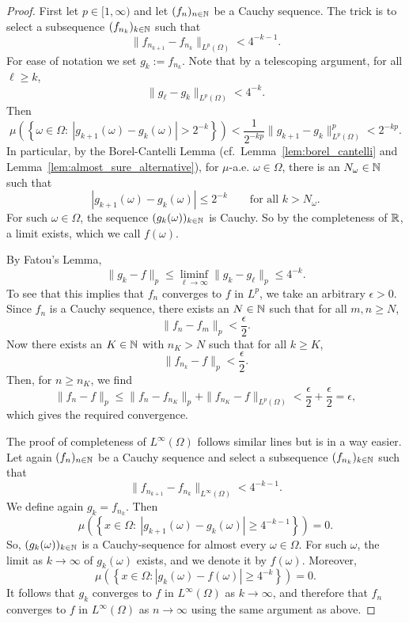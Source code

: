 \begin{proof}
First let $p \in [1,\infty)$ and let $(f_n)_{n\in\mathbb N}$ be a Cauchy sequence. The trick is to select a subsequence $(f_{n_k})_{k\in\mathbb N}$ such that 
\[
\| f_{n_{k+1}} - f_{n_k} \|_{L^p(\Omega)} < 4^{-k-1}.
\]
For ease of notation we set $g_k := f_{n_{k}}$.
Note that by a telescoping argument, for all $\ell \geq k$,
\[
\| g_\ell - g_k \|_{L^p(\Omega)} < 4^{-k}.
\]
Then
\[
\mu \left(\left\{ \omega \in \Omega : \ |g_{k+1}(\omega) - g_k(\omega) | 
> 2^{-k}  \right\} \right) < \frac{1}{2^{-k p} }\| g_{k+1} - g_k \|_{L^p(\Omega)}^p <2^{-kp}.
\]
In particular, by the Borel-Cantelli Lemma (cf.\ Lemma~\ref{lem:borel_cantelli} and Lemma~\ref{lem:almost_sure_alternative}), for $\mu$-a.e. $\omega \in \Omega$, there is an $N_\omega \in \mathbb N$ such that
\[
|g_{k+1}(\omega) - g_k(\omega)| \leq 2^{-k}\qquad\text{for all $k > N_\omega$}.
\]
For such $\omega\in\Omega$, the sequence $(g_k(\omega))_{k\in\mathbb N}$ is Cauchy. So by the completeness of $\mathbb R$, a limit exists, which we call $f(\omega)$.

By Fatou's Lemma,
\[
\| g_k - f\|_p \leq \liminf_{\ell \to \infty} \| g_k - g_\ell \|_p \leq 4^{-k}.
\]
To see that this implies that $f_n$ converges to $f$ in $L^p$, we take an arbitrary $\epsilon > 0$. 
Since $f_n$ is a Cauchy sequence, there exists an $N \in \mathbb N$ such that for all $m, n \geq N$,
\[
\|f_{n} - f_m\|_{p} < \frac{\epsilon}{2}.
\]
Now there exists an $K \in \mathbb N$ with $n_K > N$ such that for all $k \geq K$,
\[
\|f_{n_k} - f \|_{p} < \frac{\epsilon}{2}.
\]
Then, for $n \geq n_K$, we find
\[
\| f_n - f \|_{p} 
\leq \| f_{n} - f_{n_{K}} \|_{p} + \|f_{n_K} - f\|_{L^p(\Omega)}  < \frac{\epsilon}{2} + \frac{\epsilon}{2} = \epsilon,
\]
which gives the required convergence.

The proof of completeness of $L^\infty(\Omega)$ follows similar lines but is in a way easier. Let again $(f_n)_{n\in\mathbb N}$ be a Cauchy sequence and select a subsequence $(f_{n_k})_{k\in\mathbb N}$ such that
\[
\| f_{n_{k+1}} - f_{n_k} \|_{L^\infty(\Omega)} < 4^{-k-1}.
\]
We define again $g_k = f_{n_k}$.
Then
\[
\mu\left( \left\{ x \in \Omega : \ |g_{k+1}(\omega) - g_k(\omega) | \geq 4^{-k-1} \right\} \right) = 0.
\]
So, $(g_k(\omega))_{k\in\mathbb N}$ is a Cauchy-sequence for almost every $\omega \in \Omega$.
For such $\omega$, the limit as $k \to \infty$ of $g_k(\omega)$ exists, and we denote it by $f(\omega)$.
Moreover, 
\[
\mu\left( \left\{ x \in \Omega : |g_k(\omega) - f(\omega)|  \geq 4^{-k} \right\} \right) = 0.
\]
It follows that $g_k$ converges to $f$ in $L^\infty(\Omega)$ as $k \to \infty$, and therefore that $f_n$ converges to $f$ in $L^\infty(\Omega)$ as $n \to \infty$ using the same argument as above.
\end{proof}

